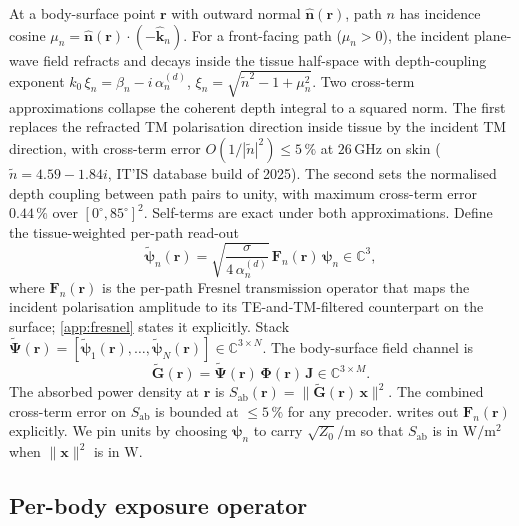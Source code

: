 \documentclass[journal,twocolumn,10pt]{IEEEtran}
\theoremstyle{plain}
\theoremstyle{remark}
\newcommand{\khat}{\hat{\bm{k}}}
\newcommand{\nhat}{\hat{\bm{n}}}
\newcommand{\rr}{\mathbf{r}}
\newcommand{\xx}{\mathbf{x}}
\newcommand{\Sab}{S_{\mathrm{ab}}}
\newcommand{\Gtil}{\tilde{\mathbf{G}}}
\newcommand{\Jmat}{\mathbf{J}}
\newcommand{\Phimat}{\mathbf{\Phi}}
\newcommand{\Psitil}{\tilde{\bm{\Psi}}}
\newcommand{\Fn}{\mathbf{F}_n}
\newcommand{\psin}{\bm{\psi}_n}
\newcommand{\Complex}{\mathbb{C}}
\newcommand{\ntilde}{\tilde{n}}
\begin{document}
At a body-surface point $\rr$ with outward normal $\nhat(\rr)$, path
$n$ has incidence cosine $\mu_n = \nhat(\rr)\cdot(-\khat_n)$. For a
front-facing path ($\mu_n > 0$), the incident plane-wave field
refracts and decays inside the tissue half-space with depth-coupling
exponent $k_0\,\xi_n = \beta_n - i\,\alpha_n^{(d)}$,
$\xi_n = \sqrt{\ntilde^2 - 1 + \mu_n^2}$. Two cross-term
approximations collapse the coherent depth integral to a squared
norm. The first replaces the refracted TM polarisation direction
inside tissue by the incident TM direction, with cross-term error
$O(1/|\ntilde|^2) \leq 5\,\%$ at $26\,$GHz on skin
($\ntilde = 4.59 - 1.84i$, IT'IS database build of 2025). The second
sets the normalised depth coupling between path pairs to unity, with
maximum cross-term error $0.44\,\%$ over $[0^\circ, 85^\circ]^2$.
Self-terms are exact under both approximations. Define the
tissue-weighted per-path read-out
\begin{equation}\label{eq:psitil}
  \tilde{\bm\psi}_n(\rr) = \sqrt{\frac{\sigma}{4\,\alpha_n^{(d)}}}\,
  \Fn(\rr)\,\psin \in \Complex^3,
\end{equation}
where $\Fn(\rr)$ is the per-path Fresnel transmission operator that
maps the incident polarisation amplitude to its TE-and-TM-filtered
counterpart on the surface; \cref{app:fresnel} states it explicitly.
Stack
$\Psitil(\rr) = [\tilde{\bm\psi}_1(\rr), \ldots,
\tilde{\bm\psi}_N(\rr)] \in \Complex^{3 \times N}$. The body-surface
field channel is
\begin{equation}\label{eq:Gtilde}
  \Gtil(\rr) = \Psitil(\rr)\,\Phimat(\rr)\,\Jmat
  \in \Complex^{3 \times M}.
\end{equation}
The absorbed power density at $\rr$ is
$\Sab(\rr) = \|\Gtil(\rr)\,\xx\|^2$. The combined cross-term error
on $\Sab$ is bounded at $\leq 5\,\%$ for any precoder.
 writes out $\Fn(\rr)$ explicitly. We pin units by
choosing $\psin$ to carry $\sqrt{Z_0}/$m so that $\Sab$ is in
$\mathrm{W}/\mathrm{m}^2$ when $\|\xx\|^2$ is in $\mathrm{W}$.

\subsection{Per-body exposure operator}\label{sec:Q}
\end{document}
